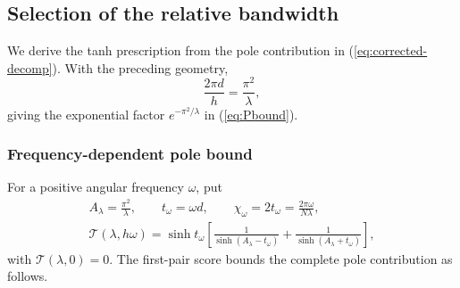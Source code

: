 \providecommand{\qeqref}[1]{(\ref{#1})}

\subsection{Selection of the relative bandwidth}
\label{sec:qi-bandwidth}

We derive the tanh prescription from the pole contribution in
\qeqref{eq:corrected-decomp}. With the preceding geometry,
\begin{equation}
 \frac{2\pi d}{h}=\frac{\pi^2}{\lambda},
 \label{eq:bandwidth-exponent}
\end{equation}
giving the exponential factor $e^{-\pi^2/\lambda}$ in \qeqref{eq:Pbound}.

\subsubsection{Frequency-dependent pole bound}
For a positive angular frequency $\omega$, put
\begin{equation}
 \begin{gathered}
 A_\lambda=\frac{\pi^2}{\lambda},\qquad
 t_\omega=\omega d,\qquad
 \chi_\omega=2t_\omega=\frac{2\pi\omega}{N\lambda},\\
 \mathcal T(\lambda,h\omega)=\sinh t_\omega
 \left[\frac1{\sinh(A_\lambda-t_\omega)}
       +\frac1{\sinh(A_\lambda+t_\omega)}\right],
 \end{gathered}
 \label{eq:bandwidth-pair}
\end{equation}
with $\mathcal T(\lambda,0)=0$. The first-pair score bounds the complete
pole contribution as follows.

